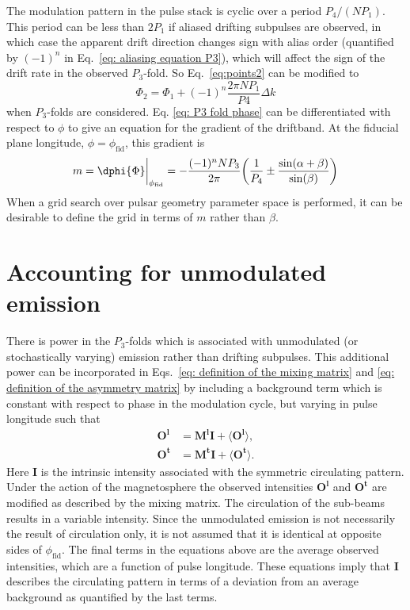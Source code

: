 The modulation pattern in the pulse stack is cyclic over a period $P_4/(NP_1)$. This period can be less than $2P_1$ if aliased drifting subpulses are observed, in which case the apparent drift direction changes sign with alias order (quantified by $(-1)^n$ in Eq.~\eqref{eq: aliasing equation P3}), which will affect the sign of the drift rate in the observed $P_3$-fold. So Eq.~\eqref{eq:points2} can be modified to
\begin{equation}
    \label{eq: P3 fold phase}
    \Phi_2 = \Phi_1 + (-1)^n\frac{2\pi N P_1}{P4}\Delta k
\end{equation}
when $P_3$-folds are considered. Eq. \eqref{eq: P3 fold phase} can be differentiated with respect to $\phi$ to give an equation for the gradient of the driftband. At the fiducial plane longitude, $\phi = \phi_\mathrm{fid}$, this gradient is
\begin{equation}
    \label{eq: drift band gradient}
    m = \dphi{\Phi}\bigg|_{\phi_\mathrm{fid}} = -\frac{(-1)^nNP_3}{2\pi}\bigg(\frac{1}{P_4} \pm \frac{\sin(\alpha + \beta)}{\sin(\beta)}\bigg)
\end{equation}
When a grid search over pulsar geometry parameter space is performed, it can be desirable to define the grid in terms of $m$ rather than $\beta$.


\section{Accounting for unmodulated emission}
\label{app: B0031temp - accounting for unmodulated emission}

There is power in the $P_3$-folds which is associated with unmodulated (or stochastically varying) emission rather than drifting subpulses. This additional power can be incorporated in Eqs.~\eqref{eq: definition of the mixing matrix} and \eqref{eq: definition of the asymmetry matrix} by including a background term which is constant with respect to phase in the modulation cycle, but varying in pulse longitude such that
\begin{align}
    \label{eq: mixing matrix with background term}
    \mathbf{O^l} &= \mathbf{M^lI}+\langle\mathbf{O^l}\rangle,\\
    \mathbf{O^t} &= \mathbf{M^tI}+\langle\mathbf{O^t}\rangle.
\end{align}
Here $\mathbf{I}$ is the intrinsic intensity associated with the symmetric circulating pattern. Under the action of the magnetosphere the observed intensities $\mathbf{O^l}$ and $\mathbf{O^t}$ are modified as described by the mixing matrix. The circulation of the sub-beams results in a variable intensity. Since the unmodulated emission is not necessarily the result of circulation only, it is not assumed that it is identical at opposite sides of $\phi_\mathrm{fid}$. The final terms in the equations above are the average observed intensities, which are a function of pulse longitude. These equations imply that $\mathbf{I}$ describes the circulating pattern in terms of a deviation from an average background as quantified by the last terms.

